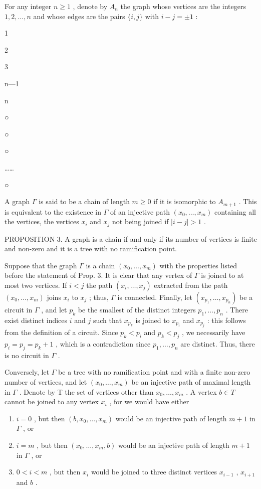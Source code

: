 For any integer \(n \geqslant 1\) , denote by \(A_{n}\) the graph whose vertices are the integers \(1, 2, \ldots, n\) and whose edges are the pairs \(\{i, j\}\) with \(i - j = \pm 1\) :

1

2

3

n---1

n

○

○

○

\ldots\ldots{}

○

A graph \(\Gamma\) is said to be a chain of length \(m \geqslant 0\) if it is isomorphic to \(A_{m+1}\) . This is equivalent to the existence in \(\Gamma\) of an injective path \((x_{0}, \ldots, x_{m})\) containing all the vertices, the vertices \(x_{i}\) and \(x_{j}\) not being joined if \(|i-j| > 1\) .

PROPOSITION 3. A graph is a chain if and only if its number of vertices is finite and non-zero and it is a tree with no ramification point.

Suppose that the graph \(\Gamma\) is a chain \((x_0, \ldots, x_m)\) with the properties listed before the statement of Prop. 3. It is clear that any vertex of \(\Gamma\) is joined to at most two vertices. If \(i < j\) the path \((x_i, \ldots, x_j)\) extracted from the path \((x_0, \ldots, x_m)\) joins \(x_i\) to \(x_j\) ; thus, \(\Gamma\) is connected. Finally, let \((x_{p_1}, \ldots, x_{p_n})\) be a circuit in \(\Gamma\) , and let \(p_k\) be the smallest of the distinct integers \(p_1, \ldots, p_n\) . There exist distinct indices \(i\) and \(j\) such that \(x_{p_k}\) is joined to \(x_{p_i}\) and \(x_{p_j}\) : this follows from the definition of a circuit. Since \(p_k < p_i\) and \(p_k < p_j\) , we necessarily have \(p_i = p_j = p_k + 1\) , which is a contradiction since \(p_1, \ldots, p_n\) are distinct. Thus, there is no circuit in \(\Gamma\) .

Conversely, let \(\Gamma\) be a tree with no ramification point and with a finite non-zero number of vertices, and let \((x_0, \ldots, x_m)\) be an injective path of maximal length in \(\Gamma\) . Denote by T the set of vertices other than \(x_0, \ldots, x_m\) . A vertex \(b \in T\) cannot be joined to any vertex \(x_i\) , for we would have either

\begin{enumerate}
\def\labelenumi{\alph{enumi})}
\item
  \(i = 0\) , but then \((b, x_0, \ldots, x_m)\) would be an injective path of length \(m + 1\) in \(\Gamma\) , or
\item
  \(i = m\) , but then \((x_0, \ldots, x_m, b)\) would be an injective path of length \(m + 1\) in \(\Gamma\) , or
\item
  \(0 < i < m\) , but then \(x_{i}\) would be joined to three distinct vertices \(x_{i-1}\) , \(x_{i+1}\) and \(b\) .
\end{enumerate}

